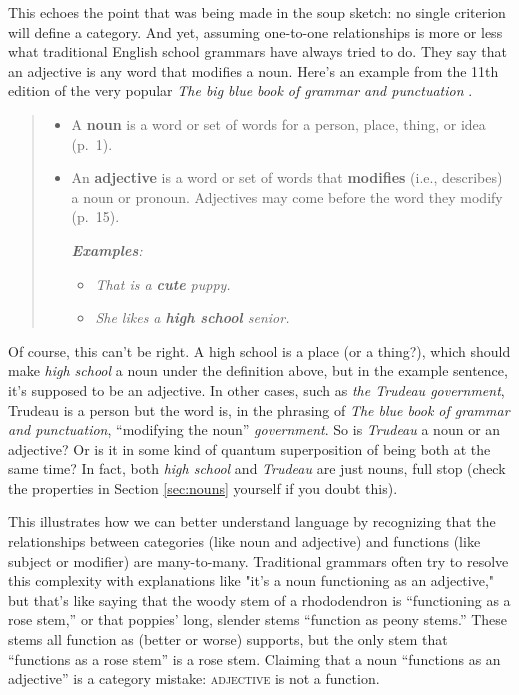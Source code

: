 This echoes the point that was being made in the soup sketch: no single criterion will define a category. And yet, assuming one-to-one relationships is more or less what traditional English school grammars have always tried to do. They say that an adjective is any word that modifies a noun. Here's an example from the 11th edition of the very popular \textit{The big blue book of grammar and punctuation} \citep{straus2014}.

\begin{quote}
    \begin{itemize}[noitemsep]
        \item A \textbf{noun} is a word or set of words for a person, place, thing, or idea (p.~1).
        \item An \textbf{adjective} is a word or set of words that \textbf{modifies} (i.e., describes) a noun or pronoun. Adjectives may come before the word they modify (p.~15).
    
        \textit{\textbf{Examples}:}
        \begin{itemize}[noitemsep]
            \item \textit{That is a \textbf{cute} puppy.}
            \item \textit{She likes a \textbf{high school} senior.}
        \end{itemize}
    \end{itemize}
\end{quote}
    
Of course, this can't be right. A high school is a place (or a thing?), which should make \textit{high school} a noun under the definition above, but in the example sentence, it's supposed to be an adjective. In other cases, such as \textit{the Trudeau government}, Trudeau is a person but the word is, in the phrasing of \textit{The blue book of grammar and punctuation}, ``modifying the noun'' \textit{government}. So is \textit{Trudeau} a noun or an adjective? Or is it in some kind of quantum superposition of being both at the same time? In fact, both \textit{high school} and \textit{Trudeau} are just nouns, full stop (check the properties in Section \ref{sec:nouns} yourself if you doubt this).

This illustrates how we can better understand language by recognizing that the relationships between categories (like noun and adjective) and functions (like subject or modifier) are many-to-many. Traditional grammars often try to resolve this complexity with explanations like "it's a noun functioning as an adjective," but that's like saying that the woody stem of a rhododendron is ``functioning as a rose stem,'' or that poppies' long, slender stems ``function as peony stems.'' These stems all function as (better or worse) supports, but the only stem that ``functions as a rose stem'' is a rose stem. Claiming that a noun ``functions as an adjective'' is a category mistake: \textsc{adjective} is not a function.

